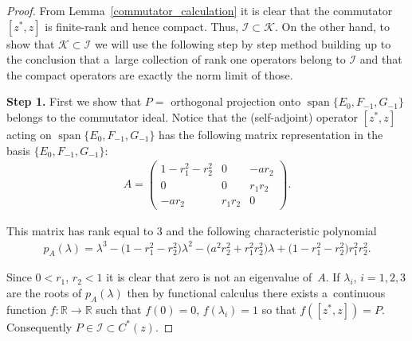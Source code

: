 \begin{proof}
From Lemma~\ref{commutator_calculation} it is clear that the commutator $[z^*, z]$ is f\/inite-rank and hence compact.
Thus, $\mathcal I \subset \mathcal K$.
On the other hand, to show that $\mathcal K \subset \mathcal I$ we will use the following step by step method building
up to the conclusion that a~large collection of rank one operators belong to $\mathcal I$ and that the compact operators
are exactly the norm limit of those.

{\bf Step 1.} First we show that $P=$ orthogonal projection onto $\operatorname{span}\{E_0, F_{-1}, G_{-1}\}$ belongs to the commutator
ideal.
Notice that the (self-adjoint) operator $[z^*{,} z]$ acting on $\operatorname{span}\{E_0, F_{{-}1}, G_{{-}1}\}$ has the following matrix
representation in the basis $\{E_0, F_{-1}, G_{-1}\}$:
\begin{gather*}
A= \left(
\begin{matrix}
1-r_1^2-r_2^2 & 0 & -ar_2
\\
0 & 0 & r_1r_2
\\
-ar_2 & r_1r_2 & 0
\end{matrix}
\right).
\end{gather*}

This matrix has rank equal to $3$ and the following characteristic polynomial
\begin{gather*}
p_A(\lambda)=\lambda^3-\big(1-r_1^2-r_2^2\big)\lambda^2-\big(a^2r_2^2+r_1^2r_2^2\big)\lambda+\big(1-r_1^2-r_2^2\big)r_1^2r_2^2.
\end{gather*}

Since $0 < r_1$, $r_2 < 1$ it is clear that zero is not an eigenvalue of~$A$.
If $\lambda_i$, $i=1,2,3$ are the roots of $p_A(\lambda)$ then by functional calculus there exists a~continuous function
$f: \mathbb R \to \mathbb R$ such that $f(0)=0$, $f(\lambda_i)=1$ so that $f([z^*,z])=P$.
Consequently $P \in \mathcal I \subset C^*(z)$.


\end{proof}
